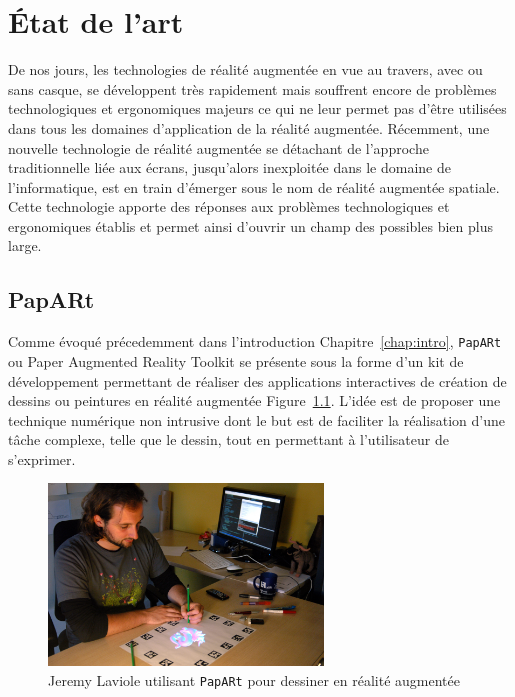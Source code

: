 \chapter{État de l'art}

De nos jours, les technologies de réalité augmentée en vue au travers, avec ou sans casque, se développent très rapidement mais souffrent encore de problèmes technologiques et ergonomiques majeurs ce qui ne leur permet pas d'être utilisées dans tous les domaines d'application de la réalité augmentée\cite{li2017state}. 
Récemment, une nouvelle technologie de réalité augmentée se détachant de l'approche traditionnelle liée aux écrans, jusqu'alors inexploitée dans le domaine de l'informatique, est en train d'émerger sous le nom de réalité augmentée spatiale. Cette technologie apporte des réponses aux problèmes technologiques et ergonomiques établis et permet ainsi d'ouvrir un champ des possibles bien plus large\cite{bimber2006modern}.

\section{PapARt}
\label{sec:papart}
Comme évoqué précedemment dans l'introduction Chapitre~\ref{chap:intro}, \texttt{PapARt} ou Paper Augmented Reality Toolkit se présente sous la forme d'un kit de développement permettant de réaliser des applications interactives de création de dessins ou peintures en réalité augmentée Figure~\ref{fig:papartdemo}. L'idée est de proposer une technique numérique non intrusive dont le but est de faciliter la réalisation d'une tâche complexe, telle que le dessin, tout en permettant à l'utilisateur de s'exprimer\cite{laviole2012papart}.

\begin{figure}[H]
\centering
\includegraphics[width=0.65\textwidth]{images/papart-demo}
\caption{Jeremy Laviole utilisant \texttt{PapARt} pour dessiner en réalité augmentée\protect\footnotemark}
\label{fig:papartdemo}
\end{figure}

